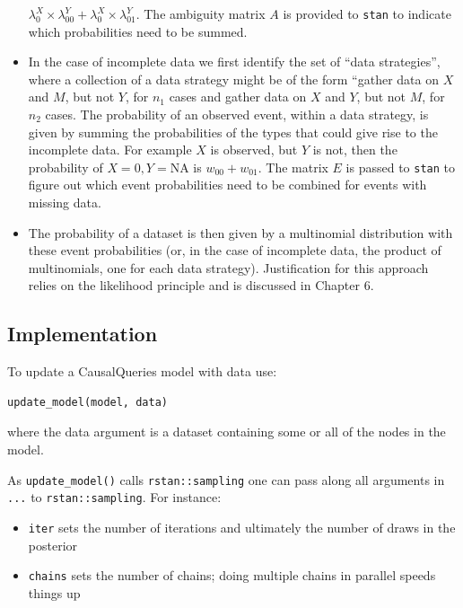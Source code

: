 \documentclass[
  article]{jss}
\providecommand{\tightlist}{%
  \setlength{\itemsep}{0pt}\setlength{\parskip}{0pt}}\usepackage{longtable,booktabs,array}
\begin{document}
\begin{itemize}
  \(\lambda^X_0\times \lambda^Y_{00} + \lambda^X_0\times \lambda^Y_{01}\).
  The ambiguity matrix \(A\) is provided to \texttt{stan} to indicate
  which probabilities need to be summed.
\item
  In the case of incomplete data we first identify the set of ``data
  strategies'', where a collection of a data strategy might be of the
  form ``gather data on \(X\) and \(M\), but not \(Y\), for \(n_1\)
  cases and gather data on \(X\) and \(Y\), but not \(M\), for \(n_2\)
  cases. The probability of an observed event, within a data strategy,
  is given by summing the probabilities of the types that could give
  rise to the incomplete data. For example \(X\) is observed, but \(Y\)
  is not, then the probability of \(X=0, Y = \text{NA}\) is
  \(w_{00} +w_{01}\). The matrix \(E\) is passed to \texttt{stan} to
  figure out which event probabilities need to be combined for events
  with missing data.
\item
  The probability of a dataset is then given by a multinomial
  distribution with these event probabilities (or, in the case of
  incomplete data, the product of multinomials, one for each data
  strategy). Justification for this approach relies on the likelihood
  principle and is discussed in Chapter 6.
\end{itemize}

\hypertarget{implementation}{%
\subsection{Implementation}\label{implementation}}

To update a CausalQueries model with data use:

\begin{verbatim}
update_model(model, data)
\end{verbatim}

where the data argument is a dataset containing some or all of the nodes
in the model.

As \texttt{update\_model()} calls \texttt{rstan::sampling} one can pass
along all arguments in \texttt{...} to \texttt{rstan::sampling}. For
instance:

\begin{itemize}
\tightlist
\item
  \texttt{iter} sets the number of iterations and ultimately the number
  of draws in the posterior
\item
  \texttt{chains} sets the number of chains; doing multiple chains in
  parallel speeds things up
\end{itemize}
\end{document}
